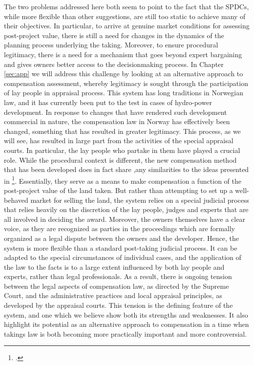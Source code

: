 The two problems addressed here both seem to point to the fact that the SPDCs, while more flexible than other suggestions, are still too static to achieve many of their objectives. In particular, to arrive at genuine market conditions for assessing post-project value, there is still a need for changes in the dynamics of the planning process underlying the taking. Moreover, to ensure procedural legitimacy, there is a need for a mechanism that goes beyond expert bargaining and gives owners better access to the decisionmaking process. In Chapter \ref{sec:app} we will address this challenge by looking at an alternative approach to compensation assessment, whereby legitimacy is sought through the participation of lay people in appraisal process. This system has long traditions in Norwegian law, and it has currently been put to the test in cases of hydro-power development. In response to changes that have rendered such development commercial in nature, the compensation law in Norway has effectively been changed, something that has resulted in greater legitimacy. This process, as we will see, has resulted in large part from the activities of the special appraisal courts. In particular, the lay people who partake in them have played a crucial role. While the procedural context is different, the new compensation method that has been developed does in fact share ,any similarities to the ideas presented in \footcite{lehavi07}. Essentially, they serve as a means to make compensation a function of the post-project value of the land taken. But rather than attempting to set up a well-behaved market for selling the land, the system relies on a special judicial process that relies heavily on the discretion of the lay people, judges and experts that are all involved in deciding the award. Moreover, the owners themselves have a clear voice, as they are recognized as parties in the proceedings which are formally organized as a legal dispute between the owners and the developer. Hence, the system is more flexible than a standard post-taking judicial process. It can be adapted to the special circumstances of individual cases, and the application of the law to the facts is to a large extent influenced by both lay people and experts, rather than legal professionals. As a result, there is ongoing tension between the legal aspects of compensation law, as directed by the Supreme Court, and the administrative practices and local appraisal principles, as developed by the appraisal courts. This tension is the defining feature of the system, and one which we believe show both its strengths and weaknesses. It also highlight its potential as an alternative approach to compensation in a time when takings law is both becoming more practically important and more controversial.

